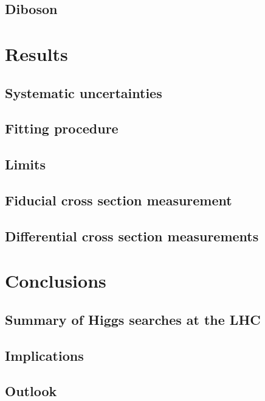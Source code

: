 \documentclass[hyper,linkcolor=blue]{mythesis}
\begin{document}
\begin{mainmatter}
    \section{\Zjets}
      \label{sec:dy}
      
    \section{Diboson}
      \label{sec:diboson}
      

  \chapter{Results}
    \label{chap:results}
    
    \section{Systematic uncertainties}
      \label{sec:systematics}
      
    \section{Fitting procedure}
    \section{Limits}
    \section{Fiducial cross section measurement}
      \label{sec:fiducial}
      
    \section{Differential cross section measurements}
      \label{sec:unfolding}
      

  \chapter{Conclusions}
    \label{chap:conclusions}
    
    \section{Summary of Higgs searches at the LHC}
      \label{sec:searches}
      
    \section{Implications}
      \label{sec:implications}
      
    \section{Outlook}
      \label{sec:outlook}
      
\end{mainmatter}

\begin{appendices}

\end{appendices}

\begin{backmatter}
  
  
\end{backmatter}
\end{document}
